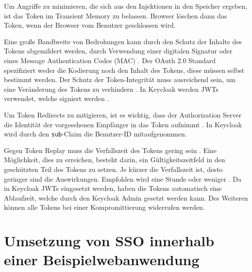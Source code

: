 Um Angriffe zu minimieren, die sich aus den Injektionen in den Speicher ergeben, ist das Token im Transient Memory zu belassen. Browser löschen dann das Token, wenn der Browser vom Benutzer geschlossen wird.

Eine große Bandbreite von Bedrohungen kann durch den Schutz der Inhalte des Tokens abgemildert werden, durch Verwendung einer digitalen Signatur oder eines Message Authentication Codes (MAC) \cite{SSEB_RFC6750}. Der OAuth 2.0 Standard spezifiziert weder die Kodierung noch den Inhalt des Tokens, diese müssen selbst bestimmt werden. Der Schutz der Token-Integrität muss ausreichend sein, um eine Veränderung des Tokens zu verhindern  \cite{SSEB_RFC6750}. In Keycloak werden JWTs verwendet, welche signiert werden \cite[Sec. 19]{SSEB_keycloakDocs}. 

Um Token Redirects zu mitigieren, ist es wichtig, dass der Authorization Server die Identität der vorgesehenen Empfänger in das Token aufnimmt \cite{SSEB_RFC6750}\cite[Sec. 19]{SSEB_keycloakDocs}. In Keycloak wird durch den \texttt{sub}-Claim die Benutzer-ID mitaufgenommen.

Gegen Token Replay muss die Verfallszeit des Tokens gering sein \cite{SSEB_RFC6750}. Eine Möglichkeit, dies zu erreichen, besteht darin, ein Gültigkeitszeitfeld in den geschützten Teil des Tokens zu setzen. Je kürzer die Verfallszeit ist, desto geringer sind die Auswirkungen. Empfohlen wird eine Stunde oder weniger \cite{SSEB_RFC6750}. Da in Keycloak JWTs eingesetzt werden, haben die Tokens automatisch eine Ablaufzeit, welche durch den Keycloak Admin gesetzt werden kann. Des Weiteren können alle Tokens bei einer Kompromittierung widerrufen werden.


\section{Umsetzung von SSO innerhalb einer Beispielwebanwendung} \label{EB_Beispielwebanwendung}


